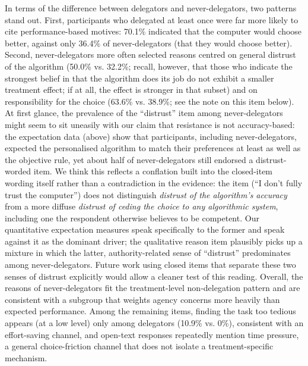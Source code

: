 \documentclass[a4paper, 12pt, fleqn]{article}
\theoremstyle{hypstyle}
\begin{document}
In terms of the difference between delegators and never-delegators, two patterns stand out. First, participants who delegated at least once were far more likely to cite performance-based motives: 70.1\% indicated that the computer would choose better, against only 36.4\% of never-delegators (that they would choose better). Second, never-delegators more often selected reasons centred on general distrust of the algorithm (50.0\% vs. 32.2\%; recall, however, that those who indicate the strongest belief in that the algorithm does its job do not exhibit a smaller treatment effect; if at all, the effect is stronger in that subset) and on responsibility for the choice (63.6\% vs. 38.9\%; see the note on this item below). At first glance, the prevalence of the ``distrust'' item among never-delegators might seem to sit uneasily with our claim that resistance is not accuracy-based: the expectation data (above) show that participants, including never-delegators, expected the personalised algorithm to match their preferences at least as well as the objective rule, yet about half of never-delegators still endorsed a distrust-worded item. We think this reflects a conflation built into the closed-item wording itself rather than a contradiction in the evidence: the item (``I don't fully trust the computer'') does not distinguish \emph{distrust of the algorithm's accuracy} from a more diffuse \emph{distrust of ceding the choice to any algorithmic system}, including one the respondent otherwise believes to be competent. Our quantitative expectation measures speak specifically to the former and speak against it as the dominant driver; the qualitative reason item plausibly picks up a mixture in which the latter, authority-related sense of ``distrust'' predominates among never-delegators. Future work using closed items that separate these two senses of distrust explicitly would allow a cleaner test of this reading. Overall, the reasons of never-delegators fit the treatment-level non-delegation pattern and are consistent with a subgroup that weights agency concerns more heavily than expected performance. Among the remaining items, finding the task too tedious appears (at a low level) only among delegators (10.9\% vs. 0\%), consistent with an effort-saving channel, and open-text responses repeatedly mention time pressure, a general choice-friction channel that does not isolate a treatment-specific mechanism.
\end{document}

